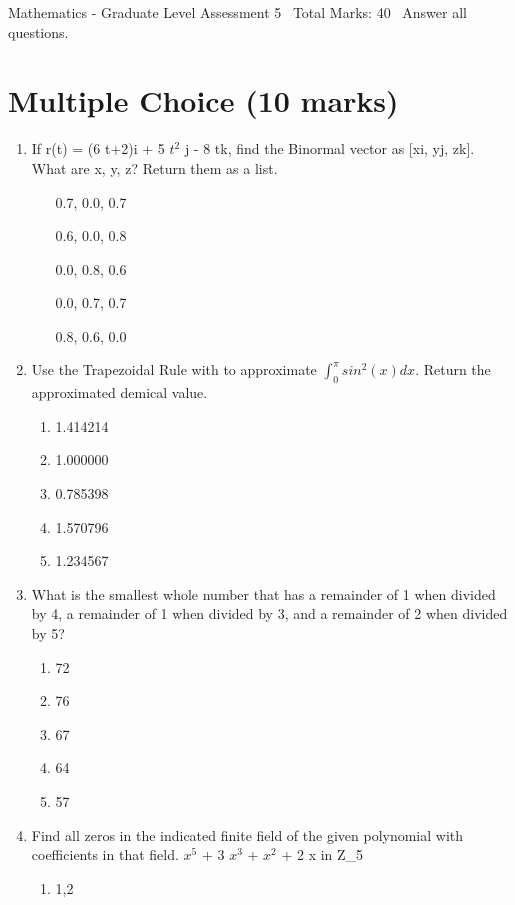 \documentclass[12pt]{article}
\begin{document}
\begin{center}
Mathematics - Graduate Level Assessment 5 \
Total Marks: 40 \
Answer all questions.
\end{center}

\section*{Multiple Choice (10 marks)}
\begin{enumerate}[label=\arabic*.]
\item If r(t) = (6 t+2)i + 5 $t^2$ j - 8 tk, find the Binormal vector as [xi, yj, zk]. What are x, y, z? Return them as a list.
\begin{enumerate}[label=(\alph*)]
    \item [0.7, 0.0, 0.7]
    \item [0.6, 0.0, 0.8]
    \item [0.0, 0.8, 0.6]
    \item [0.0, 0.7, 0.7]
    \item [0.8, 0.6, 0.0]
\end{enumerate}
\item Use the Trapezoidal Rule with to approximate $\int_0^{\pi} sin^2(x)dx$. Return the approximated demical value.
\begin{enumerate}[label=(\alph*)]
    \item 1.414214
    \item 1.000000
    \item 0.785398
    \item 1.570796
    \item 1.234567
\end{enumerate}
\item What is the smallest whole number that has a remainder of 1 when divided by 4, a remainder of 1 when divided by 3, and a remainder of 2 when divided by 5?
\begin{enumerate}[label=(\alph*)]
    \item 72
    \item 76
    \item 67
    \item 64
    \item 57
\end{enumerate}
\item Find all zeros in the indicated finite field of the given polynomial with coefficients in that field. $x^5$ + 3 $x^3$ + $x^2$ + 2 x in Z\_5
\begin{enumerate}[label=(\alph*)]
    \item 1,2

\end{enumerate}
\end{enumerate}
\end{document}
